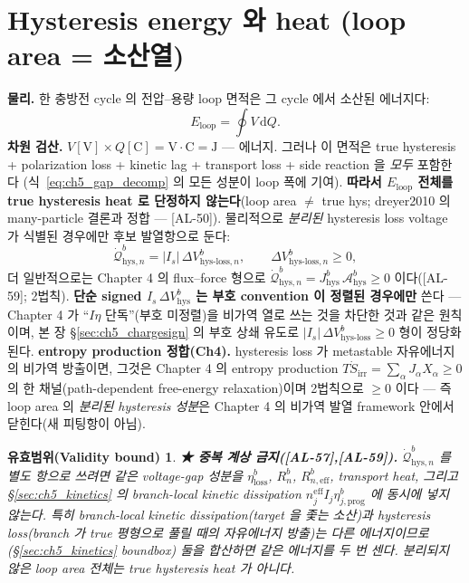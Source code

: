 \documentclass[11pt,a4paper]{article}
\newtheorem*{boundbox}{유효범위(Validity bound)}
\newcommand{\dd}{\mathrm{d}}
\newcommand{\eff}{\mathrm{eff}}
\newcommand{\irr}{\mathrm{irr}}
\newcommand{\prog}{\mathrm{prog}}
\newcommand{\hys}{\mathrm{hys}}
\newcommand{\loss}{\mathrm{loss}}
\newcommand{\AL}[1]{\textsf{[AL-#1]}}
\begin{document}
\section{Hysteresis energy 와 heat (loop area = 소산열)}\label{sec:ch5_hysheat}
\textbf{물리.} 한 충방전 cycle 의 전압--용량 loop 면적은 그 cycle 에서 소산된 에너지다:
\begin{equation}
E_{\mathrm{loop}}=\oint V\,\dd Q.
\label{eq:ch5_loop_area}
\end{equation}
\textbf{차원 검산.} $V[\mathrm V]\times Q[\mathrm C]=\mathrm{V\cdot C}=\mathrm J$ — 에너지. 그러나 이 면적은
true hysteresis + polarization loss + kinetic lag + transport loss + side reaction 을 \emph{모두} 포함한다
(식~\eqref{eq:ch5_gap_decomp} 의 모든 성분이 loop 폭에 기여). \textbf{따라서 $E_{\mathrm{loop}}$ 전체를 true
hysteresis heat 로 단정하지 않는다}(loop area $\ne$ true hys; dreyer2010 의 many-particle 결론과 정합 —
\AL{50}). 물리적으로 \emph{분리된} hysteresis loss voltage 가 식별된 경우에만 후보 발열항으로 둔다:
\begin{equation}
\dot{\mathcal Q}_{\hys,n}^b=|I_s|\,\Delta V_{\hys\text{-}\loss,n}^b,\qquad \Delta V_{\hys\text{-}\loss,n}^b\ge0,
\label{eq:ch5_hys_heat}
\end{equation}
더 일반적으로는 Chapter 4 의 flux--force 형으로 $\dot{\mathcal Q}_{\hys,n}^b=J_\hys^b\,\mathcal A_\hys^b\ge0$
이다(\AL{59}; 2법칙). \textbf{단순 signed $I_s\,\Delta V_\hys^b$ 는 부호 convention 이 정렬된 경우에만} 쓴다
— Chapter 4 가 ``$I\eta$ 단독''(부호 미정렬)을 비가역 열로 쓰는 것을 차단한 것과 같은 원칙이며, 본 장
\S\ref{sec:ch5_chargesign} 의 부호 상쇄 유도로 $|I_s|\,\Delta V_{\hys\text{-}\loss}^b\ge0$ 형이 정당화된다.
\textbf{entropy production 정합(Ch4).} hysteresis loss 가 metastable 자유에너지의 비가역 방출이면, 그것은
Chapter 4 의 entropy production $T\dot S_\irr=\sum_\alpha J_\alpha X_\alpha\ge0$ 의 한 채널(path-dependent
free-energy relaxation)이며 2법칙으로 $\ge0$ 이다 — 즉 loop area 의 \emph{분리된 hysteresis 성분}은 Chapter 4
의 비가역 발열 framework 안에서 닫힌다(새 피팅항이 아님).
\begin{boundbox}
\textbf{★ 중복 계상 금지(\AL{57},\AL{59}).} $\dot{\mathcal Q}_{\hys,n}^b$ 를 별도 항으로 쓰려면 같은 voltage-gap
성분을 $\eta_\loss^b$, $R_n^b$, $R_{n,\eff}^b$, transport heat, 그리고 \S\ref{sec:ch5_kinetics} 의 branch-local
kinetic dissipation $n_j^{\eff}I_j\eta_{j,\prog}^b$ 에 \emph{동시에} 넣지 않는다. 특히 branch-local kinetic
dissipation(target 을 좇는 소산)과 hysteresis loss(branch 가 true 평형으로 풀릴 때의 자유에너지 방출)는
\emph{다른 에너지}이므로(\S\ref{sec:ch5_kinetics} boundbox) 둘을 합산하면 같은 에너지를 두 번 센다. 분리되지
않은 loop area 전체는 true hysteresis heat 가 아니다.
\end{boundbox}
\end{document}

